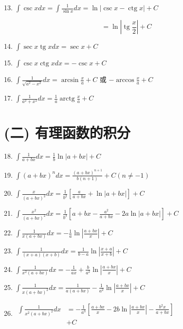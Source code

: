\documentclass[lang=cn,newtx,10pt,scheme=chinese]{elegantbook}
\begin{document}
13. \(\int \csc {xdx} = \int \frac{1}{\sin x}{dx} = \ln \left| {\csc x - \operatorname{ctg}x}\right| + C\)

\[
= \ln \left| {\operatorname{tg}\frac{x}{2}}\right| + C
\]

14. \(\int \sec x\operatorname{tg}{xdx} = \sec x + C\)

15. \(\int \csc x\operatorname{ctg}{xdx} = - \csc x + C\)

16. \(\int \frac{1}{\sqrt{{a}^{2} - {x}^{2}}}{dx} = \arcsin \frac{x}{a} + C\) 或 \(- \arccos \frac{x}{a} + C\)

17. \(\int \frac{1}{{a}^{2} + {x}^{2}}{dx} = \frac{1}{a}\operatorname{arctg}\frac{x}{a} + C\)

\section*{(二) 有理函数的积分}

18. \(\int \frac{1}{a + {bx}}{dx} = \frac{1}{b}\ln \left| {a + {bx}}\right| + C\)

19. \(\int {\left( a + bx\right) }^{n}{dx} = \frac{{\left( a + bx\right) }^{n + 1}}{b\left( {n + 1}\right) } + C\left( {n \neq - 1}\right)\)

20. \(\int \frac{x}{{\left( a + bx\right) }^{2}}{dx} = \frac{1}{{b}^{2}}\left\lbrack {\frac{a}{a + {bx}} + \ln \left| {a + {bx}}\right| }\right\rbrack + C\)

21. \(\int \frac{{x}^{2}}{{\left( a + bx\right) }^{2}}{dx} = \frac{1}{{b}^{3}}\left\lbrack {a + {bx} - \frac{{a}^{2}}{a + {bx}} - {2a}\ln \left| {a + {bx}}\right| }\right\rbrack + C\)

22. \(\int \frac{1}{x\left( {a + {bx}}\right) }{dx} = - \frac{1}{a}\ln \left| \frac{a + {bx}}{x}\right| + C\)

23. \(\int \frac{1}{\left( {x + a}\right) \left( {x + b}\right) }{dx} = \frac{1}{b - a}\ln \left| \frac{x + a}{x + b}\right| + C\)

24. \(\int \frac{1}{{x}^{2}\left( {a + {bx}}\right) }{dx} = - \frac{1}{ax} + \frac{b}{{a}^{2}}\ln \left| \frac{a + {bx}}{x}\right| + C\)

25. \(\int \frac{1}{x{\left( a + bx\right) }^{2}}{dx} = \frac{1}{a\left( {a + {bx}}\right) } - \frac{1}{{a}^{2}}\ln \left| \frac{a + {bx}}{x}\right| + C\)

26. \(\begin{aligned} \int \frac{1}{{x}^{2}{\left( a + bx\right) }^{2}}{dx} & = - \frac{1}{{a}^{3}}\left\lbrack {\frac{a + {bx}}{x} - {2b}\ln \left| \frac{a + {bx}}{x}\right| - \frac{{b}^{2}x}{a + {bx}}}\right\rbrack \\ & + C \end{aligned}\)
\end{document}
